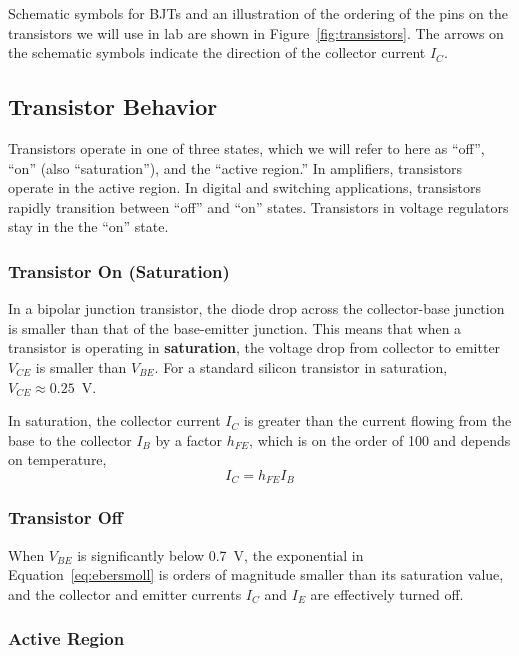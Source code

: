 \documentclass[11pt]{article}
\begin{document}
Schematic symbols for BJTs and an illustration of the ordering of the
pins on the transistors we will use in lab are shown in
Figure~\ref{fig:transistors}. The arrows on the schematic symbols
indicate the direction of the collector current $I_C$.

\subsection{Transistor Behavior}

Transistors operate in one of three states, which we will refer to
here as ``off'', ``on'' (also ``saturation''), and the ``active
region.'' In amplifiers, transistors operate in the active region. In
digital and switching applications, transistors rapidly transition
between ``off'' and ``on'' states. Transistors in voltage regulators
stay in the the ``on'' state.

\subsubsection*{Transistor On (Saturation)}

In a bipolar junction transistor, the diode drop across the
collector-base junction is smaller than that of the base-emitter
junction.  This means that when a transistor is operating in
\textbf{saturation}, the voltage drop from collector to emitter
$V_{CE}$ is smaller than $V_{BE}$.  For a standard silicon transistor
in saturation, $V_{CE} \approx 0.25$~V.

In saturation, the collector current $I_C$ is greater than the current
flowing from the base to the collector $I_B$ by a factor $h_{FE}$,
which is on the order of 100 and depends on temperature,
\begin{equation}
  I_C = h_{FE} I_B
  \label{eq:hfe}
\end{equation}

\subsubsection*{Transistor Off}

When $V_{BE}$ is significantly below 0.7~V, the exponential in
Equation~\ref{eq:ebersmoll} is orders of magnitude smaller than its
saturation value, and the collector and emitter currents $I_C$ and
$I_E$ are effectively turned off. 

\subsubsection*{Active Region}
\end{document}
